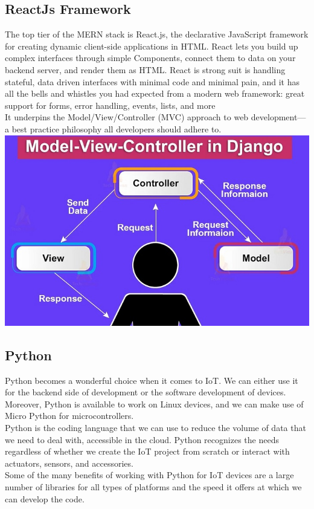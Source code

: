 \subsection{ReactJs Framework}
The top tier of the MERN stack is React.js, the declarative JavaScript framework for creating dynamic client-side applications in HTML. React lets you build up complex interfaces through simple Components, connect them to data on your backend server, and render them as HTML. React is strong suit is handling stateful, data driven interfaces with minimal code and minimal pain, and it has all the bells and whistles you had expected from a modern web framework: great support for forms, error handling, events, lists, and more 
\\

\textbullet \hspace{0.2cm}	It underpins the Model/View/Controller (MVC) approach to web development—a best practice philosophy all developers should adhere to.\\

\includegraphics[scale=1.0]{Ch2/mvc1.jpg}


\label{fig:MVC Model}

\subsection{Python}
\textbullet \hspace{0.2cm} Python becomes a wonderful choice when it comes to IoT. We can either use it for the backend side of development or the software development of devices. Moreover, Python is available to work on Linux devices, and we can make use of Micro Python for microcontrollers.  \\
\textbullet \hspace{0.2cm} Python is the coding language that we can use to reduce the volume of data that we need to deal with, accessible in the cloud. Python recognizes the needs regardless of whether we create the IoT project from scratch or interact with actuators, sensors, and accessories. \\  
\textbullet \hspace{0.2cm} Some of the many benefits of working with Python for IoT devices are a large number of libraries for all types of platforms and the speed it offers at which we can develop the code. 




